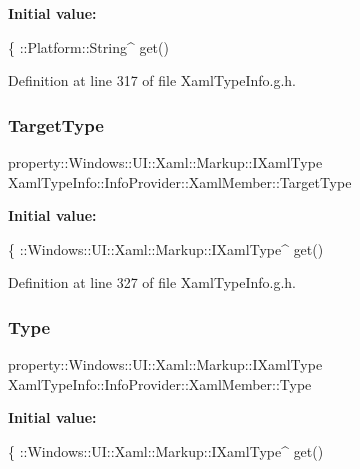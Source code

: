 {\bfseries Initial value\+:}
\begin{DoxyCode}
\{ 
                ::Platform::String^ \textcolor{keyword}{get}()
\end{DoxyCode}


Definition at line 317 of file Xaml\+Type\+Info.\+g.\+h.

\mbox{\label{class_xaml_type_info_1_1_info_provider_1_1_xaml_member_aba768b49f071f01bf32e19d594b48026}} 
\subsubsection{\texorpdfstring{Target\+Type}{TargetType}}
{\footnotesize\ttfamily property\+::\+Windows\+::\+U\+I\+::\+Xaml\+::\+Markup\+::\+I\+Xaml\+Type Xaml\+Type\+Info\+::\+Info\+Provider\+::\+Xaml\+Member\+::\+Target\+Type}

{\bfseries Initial value\+:}
\begin{DoxyCode}
\{
                ::Windows::UI::Xaml::Markup::IXamlType^ \textcolor{keyword}{get}()
\end{DoxyCode}


Definition at line 327 of file Xaml\+Type\+Info.\+g.\+h.

\mbox{\label{class_xaml_type_info_1_1_info_provider_1_1_xaml_member_a3562e6c2f5feb3c81fb14658fb250360}} 
\subsubsection{\texorpdfstring{Type}{Type}}
{\footnotesize\ttfamily property\+::\+Windows\+::\+U\+I\+::\+Xaml\+::\+Markup\+::\+I\+Xaml\+Type Xaml\+Type\+Info\+::\+Info\+Provider\+::\+Xaml\+Member\+::\+Type}

{\bfseries Initial value\+:}
\begin{DoxyCode}
\{
                ::Windows::UI::Xaml::Markup::IXamlType^ \textcolor{keyword}{get}()
\end{DoxyCode}



